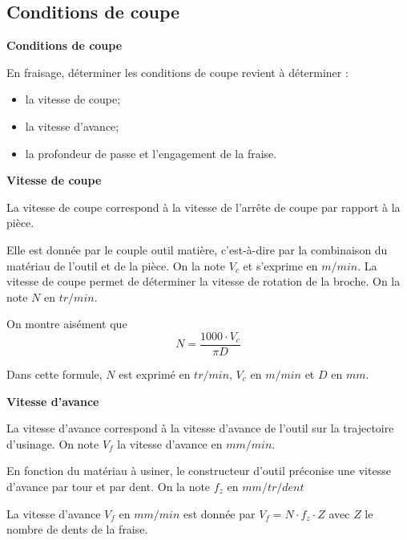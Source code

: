 \documentclass[11pt,oneside]{article}
\begin{document}
\subsection{Conditions de coupe}

\begin{defi}
\textbf{Conditions de coupe}

En fraisage, déterminer les conditions de coupe revient à déterminer : 
\begin{itemize}
\item la vitesse de coupe;
\item la vitesse d'avance; 
\item la profondeur de passe et l'engagement de la fraise.
\end{itemize}
\end{defi}

\begin{defi}
\textbf{Vitesse de coupe}

La vitesse de coupe correspond à la vitesse de l'arrête de coupe par rapport à la pièce. 

Elle est donnée par le couple outil matière, c'est-à-dire par la combinaison du matériau de l'outil et de la pièce. On la note $V_c$ et s'exprime en $m/min$. La vitesse de coupe permet de déterminer la vitesse de rotation de la broche. On la note $N$ en $tr/min$. 

On montre aisément que 
$$
N= \dfrac{1000\cdot V_c}{\pi D}
$$

Dans cette formule, $N$ est exprimé en $tr/min$, $V_c$ en $m/min$ et $D$ en $mm$.
\end{defi}


\begin{defi}
\textbf{Vitesse d'avance}

La vitesse d'avance correspond à la vitesse d'avance de l'outil sur la trajectoire d'usinage. On note $V_f$ la vitesse d'avance en $mm/min$. 

En fonction du matériau à usiner, le constructeur d'outil préconise une vitesse d'avance par tour et par dent. On la note $f_z$ en $mm/tr/dent$ 

La vitesse d'avance $V_f$ en $mm/min$ est donnée par $V_f = N\cdot f_z \cdot Z$ avec $Z$ le nombre de dents de la fraise. 
\end{defi}

\end{document}
